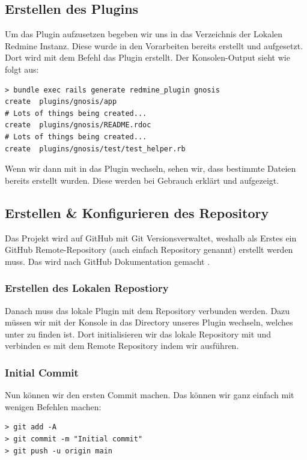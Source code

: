 \subsection{Erstellen des Plugins}
Um das Plugin aufzusetzen begeben wir uns in das Verzeichnis der Lokalen Redmine Instanz. Diese wurde in den
Vorarbeiten bereits erstellt und aufgesetzt. \newline
Dort wird mit dem Befehl  das Plugin erstellt. Der
Konsolen-Output sieht wie folgt aus:
\begin{codebox}[]
  \begin{verbatim}
> bundle exec rails generate redmine_plugin gnosis
create  plugins/gnosis/app
# Lots of things being created...
create  plugins/gnosis/README.rdoc
# Lots of things being created...
create  plugins/gnosis/test/test_helper.rb
  \end{verbatim}
\end{codebox}

Wenn wir dann mit  in das Plugin wechseln, sehen wir, dass bestimmte Dateien
bereits erstellt wurden. Diese werden bei Gebrauch erklärt und aufgezeigt.

\subsection{Erstellen \& Konfigurieren des Repository}
Das Projekt wird auf GitHub mit Git Versionsverwaltet, weshalb als Erstes ein GitHub Remote-Repository (auch einfach
Repository genannt) erstellt werden muss. Das wird nach GitHub Dokumentation gemacht \cite{github_create_repo}.

\subsubsection{Erstellen des Lokalen Repostiory}
Danach muss das lokale Plugin mit dem Repository verbunden werden. Dazu müssen wir mit der Konsole in das Directory
unseres Plugin wechseln, welches unter  zu finden ist. \newline
Dort initialisieren wir das lokale Repository mit  und verbinden es mit dem Remote
Repository indem wir  ausführen.

\subsubsection{Initial Commit}
Nun können wir den ersten Commit machen. Das können wir ganz einfach mit wenigen Befehlen machen:
\begin{codebox}[]
  \begin{verbatim}
> git add -A
> git commit -m "Initial commit"
> git push -u origin main
  \end{verbatim}
\end{codebox}

